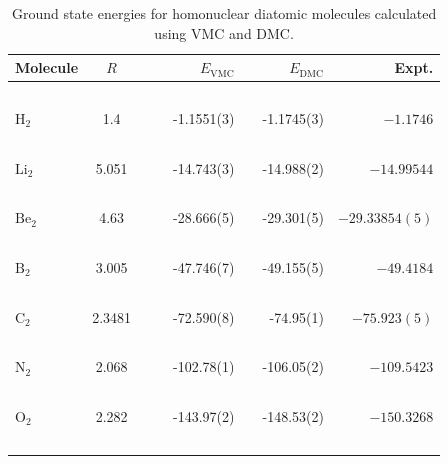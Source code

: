 \begin{frame}
 \begin{table}
\begin{center}
\begin{tabular}{lcccrlrr}
Molecule & $R$ & & \qquad & $E_\mathrm{VMC}$ & & \qquad $E_\mathrm{DMC}$ & \qquad\,\, Expt.\\
\hline\hline
\ \\
$\mathrm{H_2}$ & 1.4   & &\qquad & -1.1551(3)    & \qquad   & -1.1745(3)   & \qquad $-1.1746$     \\
\ \\
$\mathrm{Li_2}$& 5.051 & &\qquad & -14.743(3)    & \qquad   & -14.988(2)   & \qquad $-14.99544$     \\
\ \\
$\mathrm{Be_2}$& 4.63  & &\qquad & -28.666(5)    & \qquad   & -29.301(5)   & \qquad $-29.33854(5)$  \\
\ \\
$\mathrm{B_2}$ & 3.005 & &\qquad & -47.746(7)    & \qquad   & -49.155(5)   & \qquad $-49.4184$    \\
\ \\
$\mathrm{C_2}$ & 2.3481& &\qquad & -72.590(8)    & \qquad   & -74.95(1)    & \qquad $-75.923(5)$   \\
\ \\
$\mathrm{N_2}$ & 2.068 & &\qquad & -102.78(1)    & \qquad   & -106.05(2)   & \qquad $-109.5423$    \\
\ \\
$\mathrm{O_2}$ & 2.282 & &\qquad & -143.97(2)    & \qquad   & -148.53(2)   & \qquad $-150.3268$    \\
\ \\
\end{tabular}
\caption{Ground state energies for homonuclear diatomic molecules calculated using VMC and DMC. }
\label{tab:MoleculesRes}
\end{center}
\end{table}
\end{frame}


